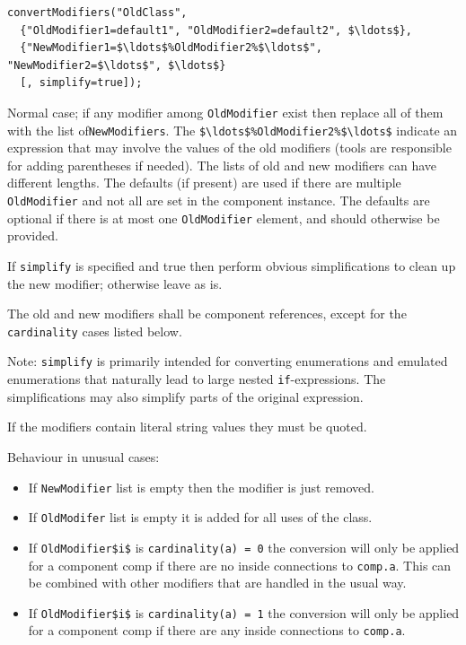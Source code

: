 \begin{lstlisting}[language=modelica]
convertModifiers("OldClass",
  {"OldModifier1=default1", "OldModifier2=default2", $\ldots$},
  {"NewModifier1=$\ldots$%OldModifier2%$\ldots$", "NewModifier2=$\ldots$", $\ldots$}
  [, simplify=true]);
\end{lstlisting}

Normal case; if any modifier among \lstinline!OldModifier! exist then replace all of them with the list of\linebreak[4] \lstinline!NewModifiers!.
The \lstinline!$\ldots$%OldModifier2%$\ldots$! indicate an expression that may involve the values of the old modifiers (tools are responsible for adding parentheses if needed).
The lists of old and new modifiers can have different lengths.
The defaults (if present) are used if there are multiple \lstinline!OldModifier! and not all are set in the component instance.
The defaults are optional if there is at most one \lstinline!OldModifier! element, and should otherwise be provided.

If \lstinline!simplify! is specified and true then perform obvious simplifications to clean up the new modifier; otherwise leave as is.

The old and new modifiers shall be component references, except for the \lstinline!cardinality! cases listed below.

\begin{nonnormative}
Note: \lstinline!simplify! is primarily intended for converting enumerations and emulated enumerations that naturally lead to large nested \lstinline!if!-expressions.
The simplifications may also simplify parts of the original expression.
\end{nonnormative}

If the modifiers contain literal string values they must be quoted.

Behaviour in unusual cases:
\begin{itemize}
\item
  If \lstinline!NewModifier! list is empty then the modifier is just removed.
\item
  If \lstinline!OldModifer! list is empty it is added for all uses of the class.
\item
  If \lstinline!OldModifier$i$! is \lstinline!cardinality(a) = 0! the conversion will only be applied for a component comp if there are no inside connections to \lstinline!comp.a!.
  This can be combined with other modifiers that are handled in the usual way.
\item
  If \lstinline!OldModifier$i$! is \lstinline!cardinality(a) = 1! the conversion will only be applied for a component comp if there are any inside connections to \lstinline!comp.a!.
\end{itemize}

